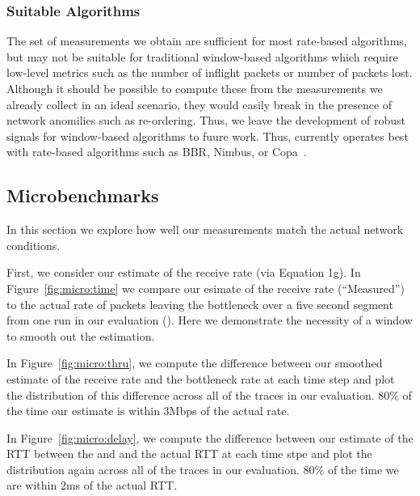 \subsubsection{Suitable Algorithms}
\label{s:measure:limitation:algs}
The set of measurements we obtain are sufficient for most rate-based algorithms, but may not be 
suitable for traditional window-based algorithms which require low-level metrics such as 
the number of inflight packets or number of packets lost. Although it should be possible
to compute these from the measurements we already collect in an ideal scenario, they would easily
break in the presence of network anomilies such as re-ordering. Thus, we leave the development
of robust signals for window-based algorithms to fuure work. 
Thus, \name currently operates best with rate-based algorithms such as BBR, Nimbus, or Copa~\cite{bbr,nimbus,copa}.


\subsection{Microbenchmarks}
\label{s:measure:microbench}
    
    
    
    In this section we explore how well our measurements match the actual network conditions. 

    First, we consider our estimate of the receive rate (via Equation 1g). In Figure~\ref{fig:micro:time}
    we compare our esimate of the receive rate (``Measured'') to the actual rate of packets 
    leaving the bottleneck over a five second segment from one run in our evaluation ().
    Here we demonstrate the necessity of a window to smooth out the estimation.

    In Figure~\ref{fig:micro:thru}, we compute the difference between our smoothed estimate of the receive rate 
    and the bottleneck rate at each time step and plot the distribution of this difference across
    all of the traces in our evaluation. 80\% of the time our estimate is within 3Mbps of the 
    actual rate.

    In Figure~\ref{fig:micro:delay}, we compute the difference between our estimate of the RTT between
    the \inbox and \outbox and the actual RTT at each time stpe and plot the distribution again
    across all of the traces in our evaluation. 80\% of the time we are within 2ms of the actual RTT.
    
